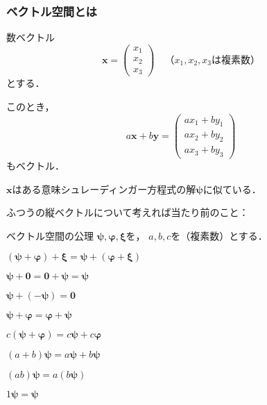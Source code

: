 \documentclass[
    10pt,
    ]{sotsu-beamer}
\begin{document}
\begin{frame}[allowframebreaks]
    \frametitle{ベクトル空間とは}

    数ベクトル
    \begin{equation*}
        \symbf{x} = 
        \begin{pmatrix}
            x_1 \\ x_2  \\ x_3
        \end{pmatrix}
        \quad
        \text{（$x_1, x_2, x_3$は複素数）}
    \end{equation*}
    とする．

    このとき，
    \begin{equation*}
        a \symbf{x} + b \symbf{y}
        = \begin{pmatrix}
            a x_1 + b y_1  \\
            a x_2 + b y_2  \\
            a x_3 + b y_3
        \end{pmatrix}
    \end{equation*}
    もベクトル．

    \pause

    $\symbf{x}$はある意味\alert{シュレーディンガー方程式の解$\symbf{\psi}$に似ている}．



    \framebreak

    ふつうの縦ベクトルについて考えれば当たり前のこと：
    \begin{block}{ベクトル空間の公理}
        $\symbf{\psi}, \symbf{\varphi}, \symbf{\xi}$を，
        $a, b, c$を（複素数）とする．
        \begin{enumerate}
            \begin{multicols}{2}
                \item $(\symbf{\psi} + \symbf{\varphi}) + \symbf{\xi} = \symbf{\psi} + (\symbf{\varphi} + \symbf{\xi})$
                \item $\symbf{\psi} + \symbf{0} = \symbf{0} + \symbf{\psi} = \symbf{\psi}$
                \item $\symbf{\psi} + (-\symbf{\psi}) = \symbf{0}$
                \item $\symbf{\psi} + \symbf{\varphi} = \symbf{\varphi} + \symbf{\psi}$
                \item $c (\symbf{\psi} + \symbf{\varphi}) = c \symbf{\psi} + c \symbf{\varphi}$
                \item $(a + b) \symbf{\psi} = a \symbf{\psi} + b \symbf{\psi}$
                \item $(ab) \symbf{\psi} = a(b\symbf{\psi})$
                \item $1 \symbf{\psi} = \symbf{\psi}$
            \end{multicols}
        \end{enumerate}
    \end{block}


\end{frame}
\end{document}
